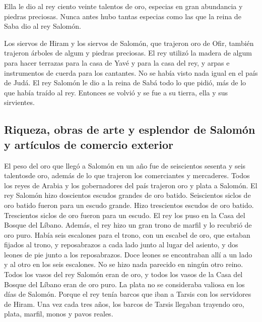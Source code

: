 \begin{paracol}{2}
 Ella le dio al rey ciento veinte talentos de oro,
especias en gran abundancia y piedras preciosas. Nunca antes hubo tantas
especias como las que la reina de Saba dio al rey Salomón.

 Los siervos de Hiram y los siervos de Salomón, que
trajeron oro de Ofir, también trajeron árboles de algum y piedras
preciosas.  El rey utilizó la madera de algum para hacer
terrazas para la casa de Yavé y para la casa del rey, y arpas e
instrumentos de cuerda para los cantantes. No se había visto nada igual
en el país de Judá.  El rey Salomón le dio a la reina de
Sabá todo lo que pidió, más de lo que había traído al rey. Entonces se
volvió y se fue a su tierra, ella y sus sirvientes.

\hypertarget{riqueza-obras-de-arte-y-esplendor-de-salomuxf3n-y-artuxedculos-de-comercio-exterior}{%
\subsection{Riqueza, obras de arte y esplendor de Salomón y artículos de
comercio
exterior}\label{riqueza-obras-de-arte-y-esplendor-de-salomuxf3n-y-artuxedculos-de-comercio-exterior}}

 El peso del oro que llegó a Salomón en un año fue de
seiscientos sesenta y seis talentosde oro,  además de lo
que trajeron los comerciantes y mercaderes. Todos los reyes de Arabia y
los gobernadores del país trajeron oro y plata a Salomón.
 El rey Salomón hizo doscientos escudos grandes de oro
batido. Seiscientos siclos de oro batido fueron para un escudo grande.
 Hizo trescientos escudos de oro batido. Trescientos
siclos de oro fueron para un escudo. El rey los puso en la Casa del
Bosque del Líbano.  Además, el rey hizo un gran trono de
marfil y lo recubrió de oro puro.  Había seis escalones
para el trono, con un escabel de oro, que estaban fijados al trono, y
reposabrazos a cada lado junto al lugar del asiento, y dos leones de pie
junto a los reposabrazos.  Doce leones se encontraban
allí a un lado y al otro en los seis escalones. No se hizo nada parecido
en ningún otro reino.  Todos los vasos del rey Salomón
eran de oro, y todos los vasos de la Casa del Bosque del Líbano eran de
oro puro. La plata no se consideraba valiosa en los días de Salomón.
 Porque el rey tenía barcos que iban a Tarsis con los
servidores de Hiram. Una vez cada tres años, los barcos de Tarsis
llegaban trayendo oro, plata, marfil, monos y pavos reales.


\end{paracol}
